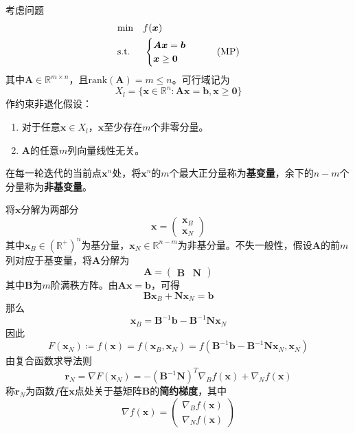 \documentclass[lang = cn, scheme = chinese, thmcnt = section]{elegantbook}
\newcommand{\R}{\mathbb{R}}            %
\newcommand{\bs}{\boldsymbol}          %
\begin{document}
考虑问题
\begin{align*}
	\label{简约梯度法}
	& \text{min}  \quad f(\bs{x})\\
	& \text{s.t.} \;\, \quad \begin{cases}
		\bs{A} \bs{x} = \bs{b}\\
		\bs{x} \ge \bs{0}
	\end{cases}\tag{$\text{MP}$}
\end{align*}
其中$\bs{A}\in\R^{m\times n}$，且$\text{rank}(\bs{A})=m\le n$。可行域记为%
$$
X_l=\{ \bs{x}\in\R^n:\bs{Ax}=\bs{b},\bs{x}\ge \bs{0} \}
$$
作约束非退化假设：
\begin{enumerate}
	\item 对于任意$\bs{x}\in X_l$，$\bs{x}$至少存在$m$个非零分量。
	\item $\bs{A}$的任意$m$列向量线性无关。
\end{enumerate}

在每一轮迭代的当前点$\bs{x}^n$处，将$\bs{x}^n$的$m$个最大正分量称为{\bf 基变量}，余下的$n-m$个分量称为{\bf 非基变量}。

将$\bs{x}$分解为两部分%
$$
\bs{x}=\begin{pmatrix}
	\bs{x}_B\\\bs{x}_N
\end{pmatrix}
$$
其中$\bs{x}_B\in(\R^+)^n$为基分量，$\bs{x}_N\in\R^{n-m}$为非基分量。不失一般性，假设$\bs{A}$的前$m$列对应于基变量，将$\bs{A}$分解为
$$
\bs{A}=\begin{pmatrix}
	\bs{B} & \bs{N}
\end{pmatrix}
$$
其中$\bs{B}$为$m$阶满秩方阵。由$\bs{Ax}=\bs{b}$，可得%
$$
\bs{Bx}_B+\bs{Nx}_N=\bs{b}
$$
那么%
$$
\bs{x}_B=\bs{B}^{-1}\bs{b}-\bs{B}^{-1}\bs{Nx}_N
$$
因此%
$$
F(\bs{x}_N)\coloneqq f(\bs{x})=f(\bs{x}_B,\bs{x}_N)
=f(\bs{B}^{-1}\bs{b}-\bs{B}^{-1}\bs{Nx}_N,\bs{x}_N)
$$
由复合函数求导法则%
$$
\bs{r}_N=\nabla F(\bs{x}_N)
=-(\bs{B}^{-1}\bs{N})^T\nabla_Bf(\bs{x})+\nabla_Nf(\bs{x})
$$
称$\bs{r}_N$为函数$f$在$\bs{x}$点处关于基矩阵$\bs{B}$的{\bf 简约梯度}，其中%
$$
\nabla f(\bs{x})=\begin{pmatrix}
	\nabla_B f(\bs{x})\\
	\nabla_N f(\bs{x})
\end{pmatrix}
$$
\end{document}
